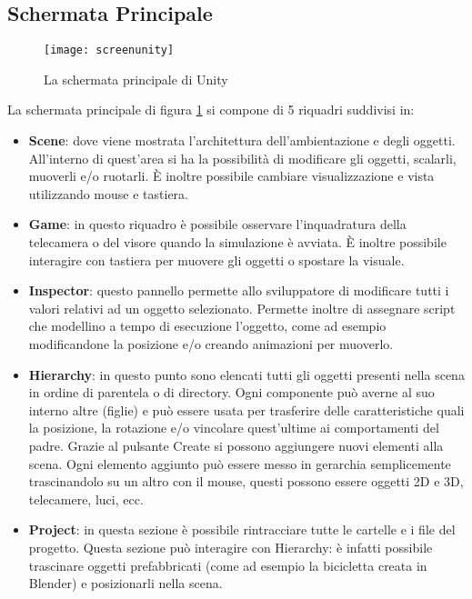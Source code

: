 \subsection{Schermata Principale}
\begin{figure}[htb]
    \centering
    \texttt{[image: screenunity]}
    \caption{La schermata principale di Unity\label{fig:screenunity}}
    \vspace{-0.3cm}
\end{figure}

\noindent La schermata principale di figura \ref{fig:screenunity} si compone di 5 riquadri suddivisi in:
\begin{itemize}
  \item \textbf{Scene}: dove viene mostrata l'architettura dell'ambientazione e degli oggetti. All'interno di quest'area si ha la possibilità di modificare gli oggetti, scalarli, muoverli e/o ruotarli. È inoltre possibile cambiare visualizzazione e vista utilizzando mouse e tastiera.
 \item \textbf{Game}: in questo riquadro è possibile osservare l'inquadratura della telecamera o del visore quando la simulazione è avviata. È inoltre possibile interagire con tastiera per muovere gli oggetti o spostare la visuale.
  \item \textbf{Inspector}: questo pannello permette allo sviluppatore di modificare tutti i valori relativi ad un oggetto selezionato. Permette inoltre di assegnare script che modellino a tempo di esecuzione l'oggetto, come ad esempio modificandone la posizione e/o creando animazioni per muoverlo. 
  \item \textbf{Hierarchy}: in questo punto sono elencati tutti gli oggetti presenti nella scena in ordine di parentela o di directory. Ogni componente può averne al suo interno altre (figlie) e può essere usata per trasferire delle caratteristiche quali la posizione, la rotazione e/o vincolare quest'ultime ai comportamenti del padre. Grazie al pulsante Create si possono aggiungere nuovi elementi alla scena. Ogni elemento aggiunto può essere messo in gerarchia semplicemente trascinandolo su un altro con il mouse, questi possono essere oggetti 2D e 3D, telecamere, luci, ecc.
    \item \textbf{Project}: in questa sezione è possibile rintracciare tutte le cartelle e i file del progetto. Questa sezione può interagire con Hierarchy: è infatti possibile trascinare oggetti prefabbricati (come ad esempio la bicicletta creata in Blender) e posizionarli nella scena.
\end{itemize}

